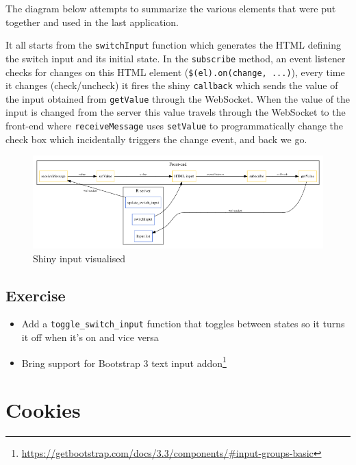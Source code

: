 \documentclass[10pt,]{krantz}
\providecommand{\tightlist}{%
  \setlength{\itemsep}{0pt}\setlength{\parskip}{0pt}}
\renewcommand{\href}[2]{#2\footnote{\url{#1}}}
\begin{document}
The diagram below attempts to summarize the various elements that were put together and used in the last application.

It all starts from the \texttt{switchInput} function which generates the HTML defining the switch input and its initial state. In the \texttt{subscribe} method, an event listener checks for changes on this HTML element (\texttt{\$(el).on(\textquotesingle{}change\textquotesingle{},\ ...)}), every time it changes (check/uncheck) it fires the shiny \texttt{callback} which sends the value of the input obtained from \texttt{getValue} through the WebSocket. When the value of the input is changed from the server this value travels through the WebSocket to the front-end where \texttt{receiveMessage} uses \texttt{setValue} to programmatically change the check box which incidentally triggers the change event, and back we go.

\begin{figure}[H]

{\centering \includegraphics[width=1\linewidth]{images/04-shiny-input} 

}

\caption{Shiny input visualised}\label{fig:shiny-input-diagram}
\end{figure}

\hypertarget{shiny-input-excercise}{%
\section{Exercise}\label{shiny-input-excercise}}

\begin{itemize}
\tightlist
\item
  Add a \texttt{toggle\_switch\_input} function that toggles between states so it turns it off when it's on and vice versa
\item
  Bring support for \href{https://getbootstrap.com/docs/3.3/components/\#input-groups-basic}{Bootstrap 3 text input addon}
\end{itemize}

\hypertarget{shiny-cookies}{%
\chapter{Cookies}\label{shiny-cookies}}
\end{document}
